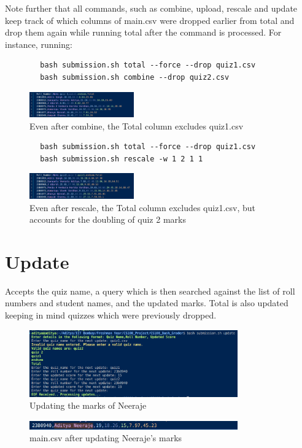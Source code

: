 \documentclass{article}
\begin{document}
    Note further that all commands, such as combine, upload, rescale and update keep track of which columns of main.csv were dropped earlier from total and drop them again while running total after the command is processed. For instance, running:
    \begin{lstlisting}
        bash submission.sh total --force --drop quiz1.csv
        bash submission.sh combine --drop quiz2.csv
    \end{lstlisting}
    \begin{figure}[htbp]
        \centering
        \includegraphics[width=0.4\textwidth]{Total_after_drop_and_combine.png}
        \caption{Even after combine, the Total column excludes quiz1.csv}
        \label{fig:total_after_combine}
    \end{figure}

    \begin{lstlisting}
        bash submission.sh total --force --drop quiz1.csv
        bash submission.sh rescale -w 1 2 1 1
    \end{lstlisting}
    \begin{figure}[htbp]
        \centering
        \includegraphics[width=0.4\textwidth]{Total_after_drop_and_rescale.png}
        \caption{Even after rescale, the Total column excludes quiz1.csv, but accounts for the doubling of quiz 2 marks}
        \label{fig:total_after_rescale}
    \end{figure}

    \section{Update}
    Accepts the quiz name, a query which is then searched against the list of roll numbers and student names, and the updated marks. Total is also updated keeping in mind quizzes which were previously dropped.
    \begin{figure}[htbp]
        \centering
        \includegraphics[width=0.8\textwidth]{Update command.png}
        \caption{Updating the marks of Neeraje}
        \label{fig:update}
    \end{figure}
    \begin{figure}[htbp]
        \centering
        \includegraphics[width=0.8\textwidth]{Result of Update.png}
        \caption{main.csv after updating Neeraje's marks}
        \label{fig:update_result}
    \end{figure}
\end{document}
